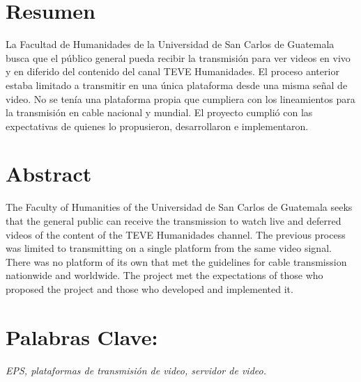 \documentclass[12pt,spanish,Letterpaper,openany]{book}
\begin{document}
\hypertarget{resumen}{%
\section*{Resumen}\label{resumen}}

La Facultad de Humanidades de la Universidad de San Carlos de Guatemala busca que el público general pueda recibir la transmisión para ver videos en vivo y en diferido del contenido del canal TEVE Humanidades. El proceso anterior estaba limitado a transmitir en una única plataforma desde una misma señal de video. No se tenía una plataforma propia que cumpliera con los lineamientos para la transmisión en cable nacional y mundial. El proyecto cumplió con las expectativas de quienes lo propusieron, desarrollaron e implementaron.

\hypertarget{abstract}{%
\section*{Abstract}\label{abstract}}

The Faculty of Humanities of the Universidad de San Carlos de Guatemala seeks that the general public can receive the transmission to watch live and deferred videos of the content of the TEVE Humanidades channel. The previous process was limited to transmitting on a single platform from the same video signal. There was no platform of its own that met the guidelines for cable transmission nationwide and worldwide. The project met the expectations of those who proposed the project and those who developed and implemented it.

\hypertarget{palabras-clave-1}{%
\section*{Palabras Clave:}\label{palabras-clave-1}}

\emph{EPS, plataformas de transmisión de video, servidor de video.}
\end{document}
